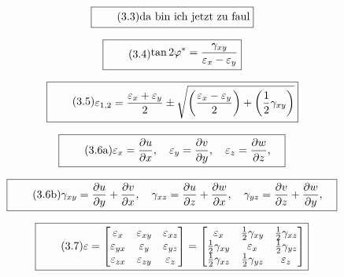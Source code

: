 \documentclass[11pt]{article}
\newcommand{\1}{ {\mathds{1}} }
\renewcommand{\epsilon}{\varepsilon}
\begin{document}
		\begin{equation}
			\boxed{
				\tag{3.3}
				\begin{split}
					\text{da bin ich jetzt zu faul}
				\end{split}
			}
		\end{equation}		

		\begin{equation}
			\boxed{
				\tag{3.4}
				\begin{split}
					\tan 2\varphi^\ast
					=
					\frac{\gamma_{xy}}{\varepsilon_x -\varepsilon_y}
				\end{split}
			}
		\end{equation}

		\begin{equation}
			\boxed{
				\tag{3.5}
				\begin{split}
					\epsilon_{1,2} = \frac{\epsilon_x + \epsilon_y}{2}
					\pm
					\sqrt{\left( \frac{\epsilon_x - \epsilon_y}{2}\right) + \left( \frac{1}{2} \gamma_{xy} \right) }
				\end{split}
			}
		\end{equation}		

		\begin{equation}
			\boxed{
				\tag{3.6a}
				\begin{split}
					\epsilon_x = \frac{\partial u}{\partial x}, \quad
					\epsilon_y = \frac{\partial v}{\partial y}, \quad
					\epsilon_z = \frac{\partial w}{\partial z}, \quad
				\end{split}
			}
		\end{equation}		

		\begin{equation}
			\boxed{
				\tag{3.6b}
				\begin{split}
					\gamma_{xy} = \frac{\partial u}{\partial y} + \frac{\partial v}{\partial x}, \quad
					\gamma_{xz} = \frac{\partial u}{\partial z} + \frac{\partial w}{\partial x}, \quad
					\gamma_{yz} = \frac{\partial v}{\partial z} + \frac{\partial w}{\partial y}, \quad
				\end{split}
			}
		\end{equation}		

		\begin{equation}
			\boxed{
				\tag{3.7}
				\begin{split}
					\mathbf{\epsilon}
					=
					\begin{bmatrix}
						\epsilon_{x } & \epsilon_{xy} & \epsilon_{xz} \\
						\epsilon_{yx} & \epsilon_{y } & \epsilon_{yz} \\
						\epsilon_{zx} & \epsilon_{zy} & \epsilon_{z } 
					\end{bmatrix}
					=
					\begin{bmatrix}
						\epsilon_x & \frac{1}{2}\gamma_{xy} & \frac{1}{2}\gamma_{xz}\\
						\frac{1}{2}\gamma_{xy} & \epsilon_x & \frac{1}{2}\gamma_{yz}\\
						\frac{1}{2}\gamma_{xz} & \frac{1}{2}\gamma_{yz} & \epsilon_z
					\end{bmatrix}
				\end{split}
			}
		\end{equation}
\end{document}
